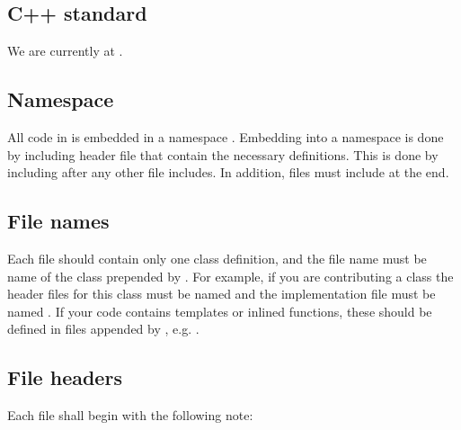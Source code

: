 \documentclass[letterpaper,10pt,english]{sphinxmanual}
\begin{document}
\subsection{C++ standard}
\label{\detokenize{Contrib/CodeStandard:c-standard}}
We are currently at .


\subsection{Namespace}
\label{\detokenize{Contrib/CodeStandard:namespace}}
All code in  is embedded in a namespace .
Embedding into a namespace is done by including header file  that contain the necessary definitions.
This is done by including after any other file includes.
In addition, files must include  at the end.


\subsection{File names}
\label{\detokenize{Contrib/CodeStandard:file-names}}
Each file should contain only one class definition, and the file name must be name of the class prepended by .
For example, if you are contributing a class  the header files for this class must be named  and the implementation file must be named .
If your code contains templates or inlined functions, these should be defined in files appended by , e.g. .


\subsection{File headers}
\label{\detokenize{Contrib/CodeStandard:file-headers}}
Each file shall begin with the following note:

\begin{sphinxVerbatim}[commandchars=\\\{\},formatcom=\scriptsize]
\end{sphinxVerbatim}
\end{document}
